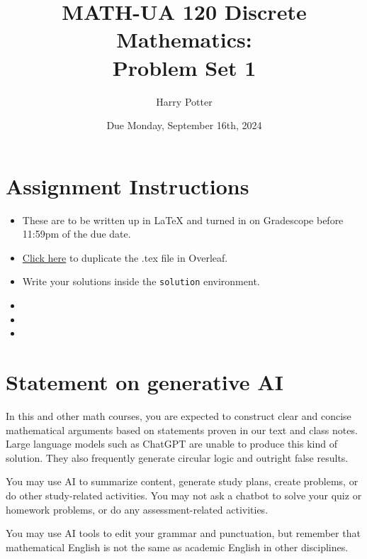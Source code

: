 \documentclass{article}
\title{MATH-UA 120 Discrete Mathematics: \\ Problem Set 1}
\author{%
    Harry Potter %
}
\date{Due Monday, September 16th, 2024}
\theoremstyle{definition}
\begin{document}
\maketitle %


\section*{Assignment Instructions}

\begin{itemize}
    \item These are to be written up in \LaTeX{} and turned in on Gradescope before 11:59pm of the due date.
    \item \href{https://www.google.com}{Click here} to duplicate the .tex file in Overleaf.
    \item Write your solutions inside the \texttt{solution} environment.
    \item 
    \item 
    \item 
\end{itemize}

\vfill

\section*{Statement on generative AI}

In this and other math courses, you are expected to construct clear and concise mathematical arguments based on statements proven in our text and class notes. Large language models such as ChatGPT are unable to produce this kind of solution. They also frequently generate circular logic and outright false results.
 
You may use AI to summarize content, generate study plans, create problems, or do other study-related activities. You may not ask a chatbot to solve your quiz or homework problems, or do any assessment-related activities.
 
You may use AI tools to edit your grammar and punctuation, but remember that mathematical English is not the same as academic English in other disciplines. 

\vfill

\newpage

\end{document}
